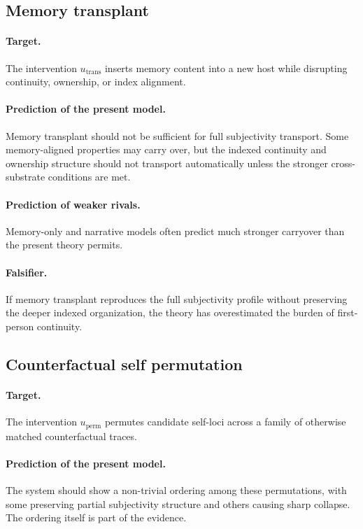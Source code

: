 \documentclass[11pt,a4paper]{article}
\theoremstyle{definition}
\begin{document}
\subsection{Memory transplant}
\paragraph{Target.} The intervention $u_{\mathrm{trans}}$ inserts memory content into a new host while disrupting continuity, ownership, or index alignment.

\paragraph{Prediction of the present model.} Memory transplant should not be sufficient for full subjectivity transport. Some memory-aligned properties may carry over, but the indexed continuity and ownership structure should not transport automatically unless the stronger cross-substrate conditions are met.

\paragraph{Prediction of weaker rivals.} Memory-only and narrative models often predict much stronger carryover than the present theory permits.

\paragraph{Falsifier.} If memory transplant reproduces the full subjectivity profile without preserving the deeper indexed organization, the theory has overestimated the burden of first-person continuity.

\subsection{Counterfactual self permutation}
\paragraph{Target.} The intervention $u_{\mathrm{perm}}$ permutes candidate self-loci across a family of otherwise matched counterfactual traces.

\paragraph{Prediction of the present model.} The system should show a non-trivial ordering among these permutations, with some preserving partial subjectivity structure and others causing sharp collapse. The ordering itself is part of the evidence.
\end{document}
